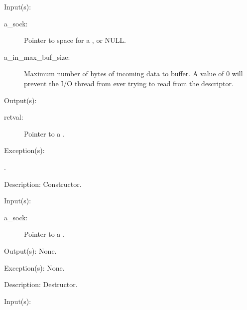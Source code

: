 \begin{capi}
\label{sock_new}
	\begin{capilist}
	\item[Input(s): ]
		\begin{description}\item[]
		\item[a\_sock: ]
			Pointer to space for a , or NULL.
		\item[a\_in\_max\_buf\_size: ]
			Maximum number of bytes of incoming data to buffer.  A
			value of 0 will prevent the I/O thread from ever trying
			to read from the descriptor.
		\end{description}
	\item[Output(s): ]
		\begin{description}\item[]
		\item[retval: ]
			Pointer to a .
		\end{description}
	\item[Exception(s): ]
		\begin{description}\item[]
		\item[.]
		\end{description}
	\item[Description: ]
		Constructor.
	\end{capilist}
\label{sock_delete}
	\begin{capilist}
	\item[Input(s): ]
		\begin{description}\item[]
		\item[a\_sock: ]
			Pointer to a \classname{sock}.
		\end{description}
	\item[Output(s): ] None.
	\item[Exception(s): ] None.
	\item[Description: ]
		Destructor.
	\end{capilist}
\label{sock_is_connected}
	\begin{capilist}
	\item[Input(s): ]

\end{capilist}
\end{capi}
